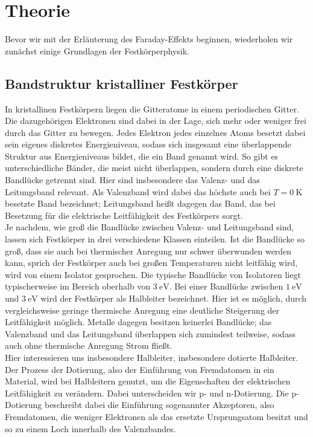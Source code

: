 \section{Theorie}
\label{sec:theorie}

Bevor wir mit der Erläuterung des Faraday-Effekts beginnen, wiederholen wir zunächst einige Grundlagen der Festkörperphysik.

\subsection{Bandstruktur kristalliner Festkörper}

In kristallinen Festkörpern liegen die Gitteratome in einem periodischen Gitter.
Die dazugehörigen Elektronen sind dabei in der Lage, sich mehr oder weniger frei durch das Gitter zu bewegen.
Jedes Elektron jedes einzelnes Atoms besetzt dabei sein eigenes diskretes Energieniveau, sodass sich insgesamt eine überlappende Struktur
aus Energieniveaus bildet, die ein Band genannt wird.
So gibt es unterschiedliche Bänder, die meist nicht überlappen, sondern durch eine diskrete Bandlücke getrennt sind.
Hier sind insbesondere das Valenz- und das Leitungsband relevant.
Als Valenzband wird dabei das höchste auch bei $T=\SI{0}{\kelvin}$ besetzte Band bezeichnet; Leitungsband heißt dagegen das Band,
das bei Besetzung für die elektrische Leitfähigkeit des Festkörpers sorgt. \\

Je nachdem, wie groß die Bandlücke zwischen Valenz- und Leitungsband sind, lassen sich Festkörper in drei verschiedene Klassen einteilen.
Ist die Bandlücke so groß, dass sie auch bei thermischer Anregung nur schwer überwunden werden kann, sprich der Festkörper auch bei großen
Temperaturen nicht leitfähig wird, wird von einem Isolator gesprochen.
Die typische Bandlücke von Isolatoren liegt typischerweise im Bereich oberhalb von $\SI{3}{\eV}$.
Bei einer Bandlücke zwischen $\SI{1}{\eV}$ und $\SI{3}{\eV}$ wird der Festkörper als Halbleiter bezeichnet.
Hier ist es möglich, durch vergleichsweise geringe thermische Anregung eine deutliche Steigerung der Leitfähigkeit möglich.
Metalle dagegen besitzen keinerlei Bandlücke; das Valenzband und das Leitungsband überlappen sich zumindest teilweise, sodass auch ohne
thermische Anregung Strom fließt. \\

Hier interessieren uns insbesondere Halbleiter, insbesondere dotierte Halbleiter.
Der Prozess der Dotierung, also der Einführung von Fremdatomen in ein Material, wird bei Halbleitern genutzt, um die Eigenschaften der
elektrischen Leitfähigkeit zu verändern.
Dabei unterscheiden wir p- und n-Dotierung.
Die p-Dotierung beschreibt dabei die Einführung sogenannter Akzeptoren, also Fremdatomen,
die weniger Elektronen als das ersetzte Ursprungsatom besitzt und so zu einem Loch innerhalb des Valenzbandes.


